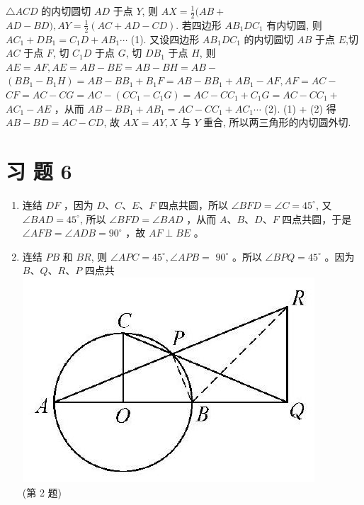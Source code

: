 \documentclass[10pt]{article}
\begin{document}
\begin{enumerate}
$\triangle A C D$ 的内切圆切 $A D$ 于点 $Y$, 则 $A X=\frac{1}{2}(A B+$ $A D-B D), A Y=\frac{1}{2}(A C+A D-C D)$. 若四边形 $A B_{1} D C_{1}$ 有内切圆, 则 $A C_{1}+D B_{1}=C_{1} D+A B_{1} \cdots$ (1). 又设四边形 $A B_{1} D C_{1}$ 的内切圆切 $A B$ 于点 $E$,切 $A C$ 于点 $F$, 切 $C_{1} D$ 于点 $G$, 切 $D B_{1}$ 于点 $H$, 则 $A E=A F, A E=A B-B E=A B-B H=A B-$ $\left(B B_{1}-B_{1} H\right)=A B-B B_{1}+B_{1} F=A B-B B_{1}+A B_{1}-A F, A F=A C-$ $C F=A C-C G=A C-\left(C C_{1}-C_{1} G\right)=A C-C C_{1}+C_{1} G=A C-C C_{1}+$ $A C_{1}-A E$ ，从而 $A B-B B_{1}+A B_{1}=A C-C C_{1}+A C_{1} \cdots$ (2). (1) + (2) 得 $A B-B D=A C-C D$, 故 $A X=A Y, X$ 与 $Y$ 重合, 所以两三角形的内切圆外切.
\end{enumerate}

\section*{习 题 6}
\begin{enumerate}
  \item 连结 $D F$ ，因为 $D 、 C 、 E 、 F$ 四点共圆，所以 $\angle B F D=\angle C=45^{\circ}$, 又 $\angle B A D=45^{\circ}$, 所以 $\angle B F D=\angle B A D$ ，从而 $A 、 B 、 D 、 F$ 四点共圆，于是 $\angle A F B=\angle A D B=90^{\circ}$ ，故 $A F \perp B E$ 。
  \item 连结 $P B$ 和 $B R$, 则 $\angle A P C=45^{\circ}, \angle A P B=$ $90^{\circ}$ 。所以 $\angle B P Q=45^{\circ}$ 。因为 $B 、 Q 、 R 、 P$ 四点共\\
\includegraphics[max width=\textwidth, center]{2024_10_30_66b8e5e701da2093c133g-095(2)}\\
(第 2 题)
\end{enumerate}
\end{document}
